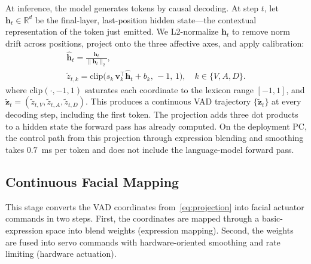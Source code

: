 \documentclass[letterpaper, 10 pt, conference]{ieeeconf}
\begin{document}
At inference, the model generates tokens by causal decoding.
At step $t$, let $\mathbf{h}_t \in \mathbb{R}^{d}$ be the final-layer, last-position hidden state---the contextual representation of the token just emitted.
We L2-normalize $\mathbf{h}_t$ to remove norm drift across positions, project onto the three affective axes, and apply calibration:
\begin{equation}
\begin{gathered}
    \hat{\mathbf{h}}_t = \frac{\mathbf{h}_t}{\|\mathbf{h}_t\|_2}, \\[2pt]
    \tilde{z}_{t,k} = \mathrm{clip}\bigl(s_k\,\mathbf{v}_k^\top\hat{\mathbf{h}}_t + b_k,\,-1,\,1\bigr),
    \quad k \in \{V, A, D\}.
\end{gathered}
\label{eq:projection}
\end{equation}
where $\mathrm{clip}(\cdot,-1,1)$ saturates each coordinate to the lexicon range $[-1,1]$, and $\tilde{\mathbf{z}}_t=(\tilde{z}_{t,V},\tilde{z}_{t,A},\tilde{z}_{t,D})$. This produces a continuous VAD trajectory $\{\tilde{\mathbf{z}}_t\}$ at every decoding step, including the first token.
The projection adds three dot products to a hidden state the forward pass has already computed. On the deployment PC, the control path from this projection through expression blending and smoothing takes $0.7$~ms per token and does not include the language-model forward pass.

\subsection{Continuous Facial Mapping}
\label{sec:actuator}

This stage converts the VAD coordinates from~\eqref{eq:projection} into facial actuator commands in two steps. First, the coordinates are mapped through a basic-expression space into blend weights (expression mapping). Second, the weights are fused into servo commands with hardware-oriented smoothing and rate limiting (hardware actuation).
\end{document}
